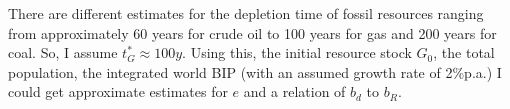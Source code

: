 There are different estimates for the depletion time of fossil resources ranging from approximately 60 years for crude oil to 100 years for gas and 200 years for coal.
So, I assume $t^*_G \approx 100y$. Using this, the initial resource stock $G_0$, the total population, the integrated world BIP (with an assumed growth rate of 2\%p.a.) I could get approximate estimates for $e$ and a relation of $b_d$ to  $b_R$.

